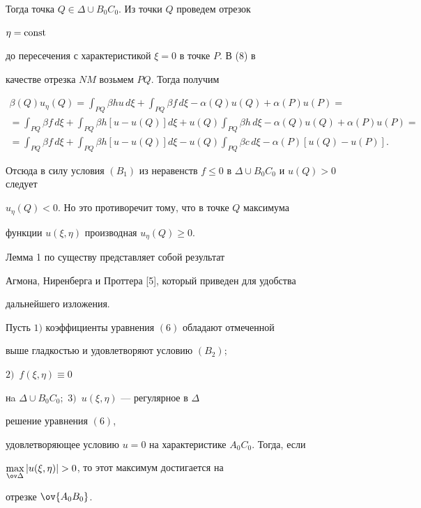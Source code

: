 Тогда точка $Q\in\Delta\cup B_0C_0$. Из точки $Q$ проведем отрезок 


$\eta=\operatorname{const}$ 


до пересечения с характеристикой $\xi=0$ в точке $P$. В (8) в 


качестве отрезка $N M$ возьмем $P Q$. Тогда получим 


\begin{multline*} 


\beta(Q)u_\eta(Q)=\int_{P Q}\beta h u\,d\xi+ 


\int_{P Q}\beta f\,d\xi-\alpha(Q)u(Q)+\alpha(P)u(P)= \\ 


% 


=\int_{P Q}\beta f\,d\xi+\int_{P Q}\beta h[u-u(Q)]d\xi+ 


u(Q)\int_{P Q}\beta h\,d\xi-\alpha(Q)u(Q)+\alpha(P)u(P)= \\ 


% 


=\int_{P Q}\beta f\,d\xi+\int_{P Q}\beta h[u-u(Q)]d\xi-u(Q) 


\int_{P Q}\beta c\,d\xi-\alpha(P)[u(Q)-u(P)]. 


\end{multline*} 


Отсюда в силу условия $(B_1)$ из неравенств $f\le0$ в $\Delta\cup 


B_0C_0$ и $u(Q)>0$ следует 


$u_\eta(Q)<0$. Но это противоречит тому, что в точке $Q$ максимума 


функции $u(\xi,\eta)$ производная $u_\eta(Q)\ge0$. 


 


\begin{note} 


Лемма 1 по существу представляет собой результат 


Агмона, Ниренберга и Проттера [5], который приведен для удобства 


дальнейшего изложения. 


\end{note} 


 


\begin{lem} 


Пусть $1)$ коэффициенты уравнения $(6)$ обладают отмеченной 


выше гладкостью и удовлетворяют условию $(B_2);$ 


$2)$~$f(\xi,\eta)\equiv0$ 


нa $\Delta\cup B_0C_0;$ $3)$~$u(\xi,\eta)$ --- регулярное в $\Delta$ 


решение уравнения $(6)$, 


удовлетворяющее условию $u=0$ на характеристике $A_0C_0$. Тогда, если 


$\max\limits_{\ov\Delta}|u(\xi,\eta)|>0$, то этот максимум достигается на 


отрезке $\ov{A_0B_0}$. 


\end{lem} 


